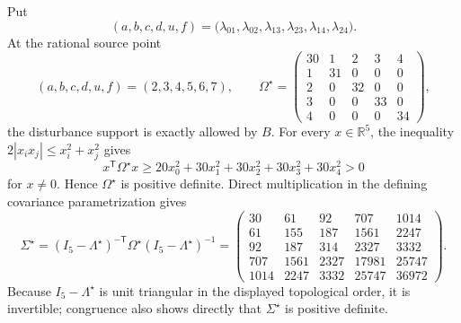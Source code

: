 Put
\[
 (a,b,c,d,u,f)
 =\bigl(\lambda_{01},\lambda_{02},\lambda_{13},
         \lambda_{23},\lambda_{14},\lambda_{24}\bigr).
\]
At the rational source point
\[
 (a,b,c,d,u,f)=(2,3,4,5,6,7),
 \qquad
 \Omega^{\star}=
 \begin{pmatrix}
 30&1&2&3&4\\
 1&31&0&0&0\\
 2&0&32&0&0\\
 3&0&0&33&0\\
 4&0&0&0&34
 \end{pmatrix},
\]
the disturbance support is exactly allowed by \(B\). For every \(x\in\mathbb R^5\), the inequality \(2|x_i x_j|\leq x_i^2+x_j^2\) gives
\[
 x^{\mathsf T}\Omega^{\star}x
 \geq20x_0^2+30x_1^2+30x_2^2+30x_3^2+30x_4^2>0
\]
for \(x\neq0\). Hence \(\Omega^{\star}\) is positive definite. Direct multiplication in the defining covariance parametrization gives
\[
 \Sigma^{\star}=(I_5-\Lambda^{\star})^{-\mathsf T}
 \Omega^{\star}(I_5-\Lambda^{\star})^{-1}
 =\begin{pmatrix}
 30&61&92&707&1014\\
 61&155&187&1561&2247\\
 92&187&314&2327&3332\\
 707&1561&2327&17981&25747\\
 1014&2247&3332&25747&36972
 \end{pmatrix}.
 \tag{7}
\]
Because \(I_5-\Lambda^{\star}\) is unit triangular in the displayed topological order, it is invertible; congruence also shows directly that \(\Sigma^{\star}\) is positive definite.

